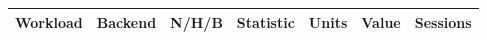 \begingroup\scriptsize
\begin{longtable}{lllllrr}
Workload & Backend & N/H/B & Statistic & Units & Value & Sessions \\
\hline
\end{longtable}
\endgroup
